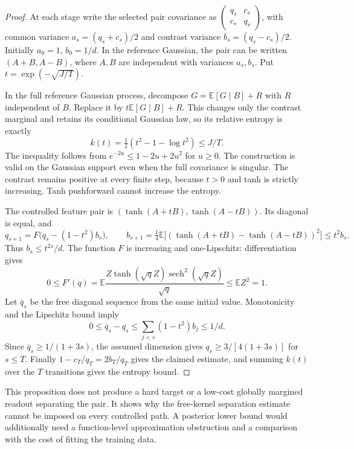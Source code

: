 \begin{proof}
At each stage write the selected pair covariance as
$\left(\begin{smallmatrix}q_s&c_s\\c_s&q_s\end{smallmatrix}\right)$,
with common variance $a_s=(q_s+c_s)/2$ and contrast variance
$b_s=(q_s-c_s)/2$. Initially $a_0=1$, $b_0=1/d$.
In the reference Gaussian, the pair can be written $(A+B,A-B)$,
where $A,B$ are independent with variances $a_s,b_s$.
Put $t=\exp(-\sqrt{J/T})$.

In the full reference Gaussian process, decompose
$G=\mathbb E[G\mid B]+R$ with $R$ independent of $B$.
Replace it by $t\mathbb E[G\mid B]+R$.
This changes only the contrast marginal and retains its conditional
Gaussian law, so its relative entropy is exactly
\[
 k(t)=\tfrac12(t^2-1-\log t^2)\le J/T.
\]
The inequality follows from $e^{-2u}\le1-2u+2u^2$ for $u\ge0$.
The construction is valid on the Gaussian support even when the full
covariance is singular. The contrast remains positive at every finite
step, because $t>0$ and tanh is strictly increasing. Tanh pushforward
cannot increase the entropy.

The controlled feature pair is
$(\tanh(A+tB),\tanh(A-tB))$. Its diagonal is equal, and
\[
 q_{s+1}=F\bigl(q_s-(1-t^2)b_s\bigr),\qquad
 b_{s+1}=\tfrac14\mathbb E\bigl[(\tanh(A+tB)-\tanh(A-tB))^2\bigr]
                  \le t^2b_s.
\]
Thus $b_s\le t^{2s}/d$.
The function $F$ is increasing and one-Lipschitz: differentiation gives
\[
 0\le F'(q)
   =\mathbb E\frac{Z\tanh(\sqrt qZ)
                   \operatorname{sech}^2(\sqrt qZ)}{\sqrt q}
   \le\mathbb EZ^2=1.
\]
Let $\bar q_s$ be the free diagonal sequence from the same initial
value. Monotonicity and the Lipschitz bound imply
\[
 0\le\bar q_s-q_s\le\sum_{j<s}(1-t^2)b_j\le1/d.
\]
Since $\bar q_s\ge1/(1+3s)$, the assumed dimension gives
$q_s\ge3/[4(1+3s)]$ for $s\le T$.
Finally $1-c_T/q_T=2b_T/q_T$ gives the claimed estimate, and summing
$k(t)$ over the $T$ transitions gives the entropy bound.
\end{proof}

This proposition does not produce a hard target or a low-cost globally
margined readout separating the pair. It shows why the free-kernel
separation estimate cannot be imposed on every controlled path.
A posterior lower bound would additionally need a function-level
approximation obstruction and a comparison with the cost of fitting the
training data.

